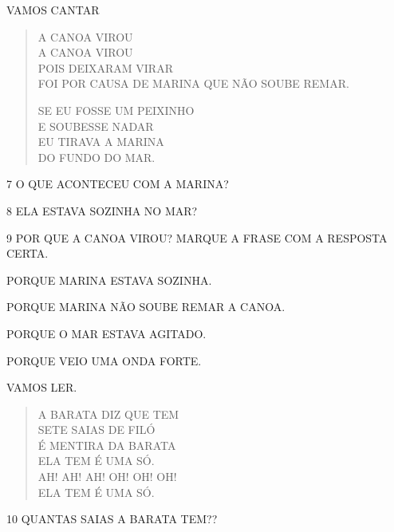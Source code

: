VAMOS CANTAR

\begin{verse}
A CANOA VIROU\\
A CANOA VIROU\\
POIS DEIXARAM VIRAR\\
FOI POR CAUSA DE MARINA QUE NÃO SOUBE REMAR.

SE EU FOSSE UM PEIXINHO\\
E SOUBESSE NADAR\\
EU TIRAVA A MARINA\\
DO FUNDO DO MAR.
\end{verse}


\num{7} O QUE ACONTECEU COM A MARINA?


\num{8} ELA ESTAVA SOZINHA NO MAR?


\num{9} POR QUE A CANOA VIROU? MARQUE A FRASE COM A RESPOSTA CERTA.

\begin{boxlist}
\boxitem[] PORQUE MARINA ESTAVA SOZINHA.

\boxitem[] PORQUE MARINA NÃO SOUBE REMAR A CANOA.

\boxitem[] PORQUE O MAR ESTAVA AGITADO.

\boxitem[] PORQUE VEIO UMA ONDA FORTE.
\end{boxlist}

VAMOS LER.

\begin{verse}
A BARATA DIZ QUE TEM\\
SETE SAIAS DE FILÓ\\
É MENTIRA DA BARATA\\
ELA TEM É UMA SÓ.\\
AH! AH! AH! OH! OH! OH!\\
ELA TEM É UMA SÓ.
\end{verse}


\num{10} QUANTAS SAIAS A BARATA TEM??

